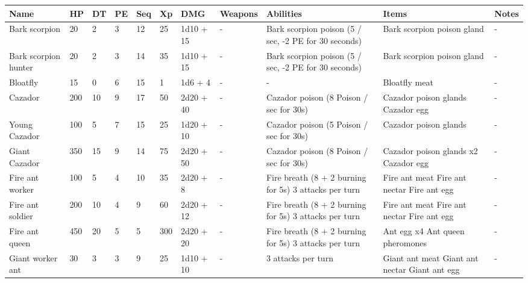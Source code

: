 
\begin{longtable}{|p{2.5cm}|p{0.6cm}|p{0.6cm}|p{0.6cm}|p{0.6cm}|p{0.6cm}|p{1.5cm}|p{4cm}|p{4cm}|p{4cm}|p{2.3cm}|}
\hline
\bfseries Name & \bfseries HP & \bfseries DT & \bfseries PE & \bfseries Seq & \bfseries Xp & \bfseries DMG & \bfseries Weapons & \bfseries Abilities & \bfseries Items & \bfseries Notes \\
\hline
\hline
\endhead
Bark scorpion & 20 & 2 & 3 & 12 & 25 & 1d10 + 15 & - & Bark scorpion poison (5 / sec, -2 PE for 30 seconds) & Bark scorpion poison gland & - \\
\hline
Bark scorpion hunter & 20 & 2 & 3 & 14 & 35 & 1d10 + 15 & - & Bark scorpion poison (5 / sec, -2 PE for 30 seconds) & Bark scorpion poison gland & - \\
\hline
Bloatfly & 15 & 0 & 6 & 15 & 1 & 1d6 + 4 & - & - & Bloatfly meat & - \\
\hline
Cazador & 200 & 10 & 9 & 17 & 50 & 2d20 + 40 & - & Cazador poison (8 Poison / sec for 30s) & Cazador poison glands \newline Cazador egg & - \\
\hline
Young Cazador & 100 & 5 & 7 & 15 & 25 & 1d20 + 10 & - & Cazador poison (5 Poison / sec for 30s) & Cazador poison glands & - \\
\hline
Giant Cazador & 350 & 15 & 9 & 14 & 75 & 2d20 + 50 & - & Cazador poison (8 Poison / sec for 30s) & Cazador poison glands x2 \newline Cazador egg & - \\
\hline
Fire ant worker & 100 & 5 & 4 & 10 & 35 & 2d20 + 8 & - & Fire breath (8 + 2 burning for 5s) 3 attacks per turn & Fire ant meat \newline Fire ant nectar \newline Fire ant egg & - \\
\hline
Fire ant soldier & 200 & 10 &  4 & 9 & 60 & 2d20 + 12 & - & Fire breath (8 + 2 burning for 5s) 3 attacks per turn & Fire ant meat \newline Fire ant nectar \newline Fire ant egg & - \\
\hline
Fire ant queen & 450 & 20 & 5 & 5 & 300 & 2d20 + 20 & - & Fire breath (8 + 2 burning for 5s) 3 attacks per turn & Ant egg x4 \newline Ant queen pheromones & - \\
\hline
Giant worker ant & 30 & 3 & 3 & 9 & 25 & 1d10 + 10 & - & 3 attacks per turn & Giant ant meat \newline Giant ant nectar \newline Giant ant egg & - \\

\end{longtable}
